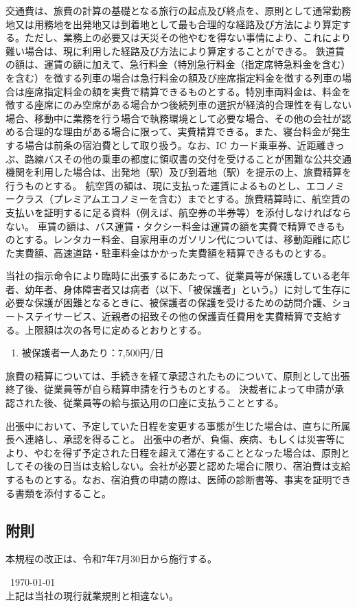 \documentclass[10pt,a4paper,uplatex]{jsarticle}
\begin{document}
交通費は、旅費の計算の基礎となる旅行の起点及び終点を、原則として通常勤務地又は用務地を出発地又は到着地として最も合理的な経路及び方法により算定する。ただし、業務上の必要又は天災その他やむを得ない事情により、これにより難い場合は、現に利用した経路及び方法により算定することができる。
\term 鉄道賃の額は、運賃の額に加えて、急行料金（特別急行料金（指定席特急料金を含む）を含む）を徴する列車の場合は急行料金の額及び座席指定料金を徴する列車の場合は座席指定料金の額を実費で精算できるものとする。特別車両料金は、料金を徴する座席にのみ空席がある場合かつ後続列車の選択が経済的合理性を有しない場合、移動中に業務を行う場合で執務環境として必要な場合、その他の会社が認める合理的な理由がある場合に限って、実費精算できる。また、寝台料金が発生する場合は前条の宿泊費として取り扱う。なお、IC カード乗車券、近距離きっぷ、路線バスその他の乗車の都度に領収書の交付を受けることが困難な公共交通機関を利用した場合は、出発地（駅）及び到着地（駅）を提示の上、旅費精算を行うものとする。
\term 航空賃の額は、現に支払った運賃によるものとし、エコノミークラス（プレミアムエコノミーを含む）までとする。旅費精算時に、航空賃の支払いを証明するに足る資料（例えば、航空券の半券等）を添付しなければならない。
\term 車賃の額は、バス運賃・タクシー料金は運賃の額を実費で精算できるものとする。レンタカー料金、自家用車のガソリン代については、移動距離に応じた実費額、高速道路・駐車料金はかかった実費額を精算できるものとする。

当社の指示命令により臨時に出張するにあたって、従業員等が保護している老年者、幼年者、身体障害者又は病者（以下、「被保護者」という。）に対して生存に必要な保護が困難となるときに、被保護者の保護を受けるための訪問介護、ショートステイサービス、近親者の招致その他の保護責任費用を実費精算で支給する。上限額は次の各号に定めるとおりとする。
\begin{enumerate}
    \item 被保護者一人あたり：7,500円/日
\end{enumerate}

旅費の精算については、手続きを経て承認されたものについて、原則として出張終了後、従業員等が自ら精算申請を行うものとする。
\term 決裁者によって申請が承認された後、従業員等の給与振込用の口座に支払うこととする。

出張中において、予定していた日程を変更する事態が生じた場合は、直ちに所属長へ連絡し、承認を得ること。
\term 出張中の者が、負傷、疾病、もしくは災害等により、やむを得ず予定された日程を超えて滞在することとなった場合は、原則としてその後の日当は支給しない。会社が必要と認めた場合に限り、宿泊費は支給するものとする。なお、宿泊費の申請の際は、医師の診断書等、事実を証明できる書類を添付すること。

\subsection*{附則}
本規程の改正は、令和7年7月30日から施行する。

\begin{flushleft}\
\today\\
\vspace{10pt}
上記は当社の現行就業規則と相違ない。\\
\vspace{10pt}
\MakeSignatureField
\end{flushleft}
\end{document}
